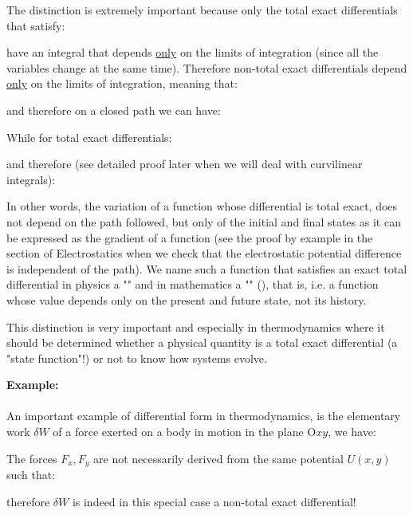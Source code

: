 	The distinction is extremely important because only the total exact differentials that satisfy:
	
	have an integral that depends \underline{only} on the limits of integration (since all the variables change at the same time). Therefore non-total exact differentials depend \underline{only} on the limits of integration, meaning that:
	
	and therefore on a closed path we can have:
	
	While for total exact differentials:
	
	and therefore (see detailed proof later when we will deal with curvilinear integrals):
	
	In other words, the variation of a function whose differential is total exact, does not depend on the path followed, but only of the initial and final states as it can be expressed as the gradient of a function (see the proof by example in the section of Electrostatics when we check that the electrostatic potential difference is independent of the path). We name such a function that satisfies an exact total differential in physics a "" and in mathematics a "" (), that is, i.e. a function whose value depends only on the present and future state, not its history.
	
	This distinction is very important and especially in thermodynamics where it should be determined whether a physical quantity is a total exact differential (a "state function"!) or not to know how systems evolve.
	
	\begin{tcolorbox}[colframe=black,colback=white,sharp corners]
	\textbf{{\Large {}}Example:}\\\\
	An important example of differential form in thermodynamics, is the elementary work $\delta W$ of a force exerted on a body in motion in the plane $\text{O}xy$, we have:
	
	The forces $F_x,F_y$ are not necessarily derived from the same potential $U(x, y)$ such that:
	
	therefore  $\delta W$ is indeed in this special case a non-total exact differential!
	\end{tcolorbox}
	
